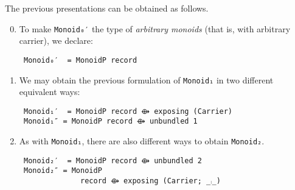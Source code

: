 \documentclass[sigplan,screen]{acmart}
\begin{document}
The previous presentations can be obtained as follows.

\begin{enumerate}
\setcounter{enumi}{-1}
\item To make \texttt{Monoid₀′} the type of \emph{arbitrary monoids}
(that is, with arbitrary carrier), we declare:
     \vspace{0.3em}
\begin{verbatim}
 Monoid₀′  = MonoidP record
\end{verbatim}

\setcounter{enumi}{0}
\item We may obtain the previous formulation of
\texttt{Monoid₁} in two different equivalent ways:
   \vspace{0.3em}
\begin{verbatim}
 Monoid₁′  = MonoidP record ⟴ exposing (Carrier)
 Monoid₁″ = MonoidP record ⟴ unbundled 1
\end{verbatim}
\end{enumerate}

\begin{enumerate}
\setcounter{enumi}{1}
\item As with \texttt{Monoid₁}, there are also different ways
to obtain \texttt{Monoid₂}.
   \vspace{0.3em}
\begin{verbatim}
 Monoid₂′  = MonoidP record ⟴ unbundled 2
 Monoid₂″ = MonoidP
              record ⟴ exposing (Carrier; _⨾_)
\end{verbatim}

\vspace{0.3em}
\end{enumerate}
\end{document}
